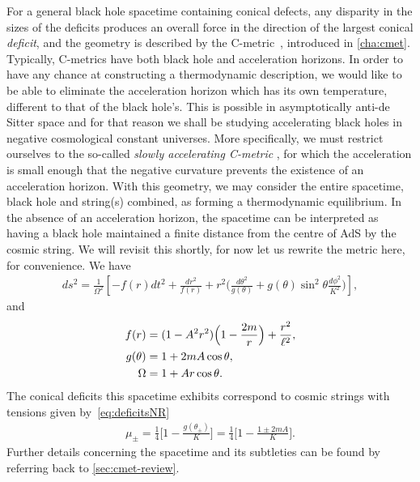 \documentclass[
twoside,
openright,
frontopenright,
]{dmathesis}
\newcommand{\nn}{\nonumber}
\begin{document}
For a general black hole spacetime containing conical defects, any disparity in
the sizes of the deficits produces an overall force in the direction of the
largest conical \emph{deficit}, and the geometry is described by the
C-metric~\cite{Kinnersley:1970zw}, introduced in \cref{cha:cmet}. Typically,
C-metrics have both black hole and acceleration horizons. In order to have any
chance at constructing a thermodynamic description, we would like to be able to
eliminate the acceleration horizon which has its own temperature, different to
that of the black hole's. This is possible in asymptotically anti-de Sitter
space and for that reason we shall be studying accelerating black holes in
negative cosmological constant universes. More specifically, we must restrict
ourselves to the so-called \emph{slowly accelerating C-metric}
\cite{Podolsky:2002nk}, for which the acceleration is small enough that the
negative curvature prevents the existence of an acceleration horizon. With this
geometry, we may consider the entire spacetime, black hole and string(s)
combined, as forming a thermodynamic equilibrium. In the absence of an
acceleration horizon, the spacetime can be interpreted as having a black hole
maintained a finite distance from the centre of AdS by the cosmic string. We
will revisit this shortly, for now let us rewrite the metric here, for
convenience. We have
\begin{align}
  ds^2=\frac{1}{\Omega^2}\left[ -
  f(r) dt^2
  +\frac{dr^2}{f(r)} + r^2 \Big( \frac{d\theta^2}{g(\theta)} 
  + g(\theta)\sin^2\theta \frac{d\phi^2}{K^2}\Big)\right],
  \label{eq:cmetric3}
\end{align}
and
\begin{align}
f(r)&=(1-A^2r^2)\Bigl(1-\frac{2 m}{r}\Bigr)
+\frac{r^2}{\ell^2},\\
  g(\theta)&=1+2mA \cos\theta,\nn\\
  \Omega&=1+Ar\cos\theta.
\label{eq:cmetric3-fun}
\end{align}
The conical deficits this spacetime exhibits correspond to cosmic strings with
tensions given by~\eqref{eq:deficitsNR}
\begin{align}
  \label{eq:tensionsNR}
  \mu_\pm=\frac14\bigg[1-\frac{g(\theta_\pm)}{K}\bigg] = \frac14\bigg[1-\frac{1\pm
  2mA}{K}\bigg]. 
\end{align} 
Further details concerning the spacetime and its subtleties can be found by
referring back to \cref{sec:cmet-review}. 
\end{document}
